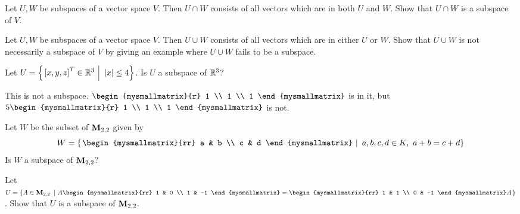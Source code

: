 \begin{ex}
  Let $U,W$ be subspaces of a vector space $V$. Then $U\cap W$ consists
  of all vectors which are in both $U$ and $W$. Show that $U\cap W$ is a
  subspace of $V$.
\end{ex}

\begin{ex}
  Let $U,W$ be subspaces of a vector space $V$. Then $U\cup W$
  consists of all vectors which are in either $U$ or $W$. Show that
  $U\cup W$ is not necessarily a subspace of $V$ by giving an example
  where $U\cup W$ fails to be a subspace.
\end{ex}

\begin{ex}
  Let $U=\left\{\left.\left[x,y,z\right]^T \in \mathbb{R}^3~\right\vert~\left|x\right| \leq 4\right\}$. Is $U$ a
  subspace of $\mathbb{R}^3$?
  \begin{sol}
    This is not a subspace.
    $\begin{mysmallmatrix}{r} 1 \\ 1 \\ 1 \end{mysmallmatrix}$ is in it, but
    $5\begin{mysmallmatrix}{r} 1 \\ 1 \\ 1 \end{mysmallmatrix} $ is not.
  \end{sol}
\end{ex}

\begin{ex}
  Let $W$ be the subset of\/ $\mathbf{M}_{2,2}$ given by
  \begin{equation*}
    W = \set{\left.\begin{mysmallmatrix}{rr}
        a  & b \\
        c & d
      \end{mysmallmatrix}~\right\vert~ a,b,c,d \in K,~ a + b = c + d}
  \end{equation*}
  Is $W$ a subspace of $\mathbf{M}_{2,2}$?
\end{ex}

\begin{ex}
  Let $U=\set{
    A\in\Mat_{2,2}
    ~\left\vert~
      A\begin{mysmallmatrix}{rr} 1 & 0 \\ 1 & -1 \end{mysmallmatrix}
      = \begin{mysmallmatrix}{rr} 1 & 1 \\ 0 & -1 \end{mysmallmatrix} A
    \right.}$.
  Show that $U$ is a subspace of $\mathbf{M}_{2,2}$.
\end{ex}

